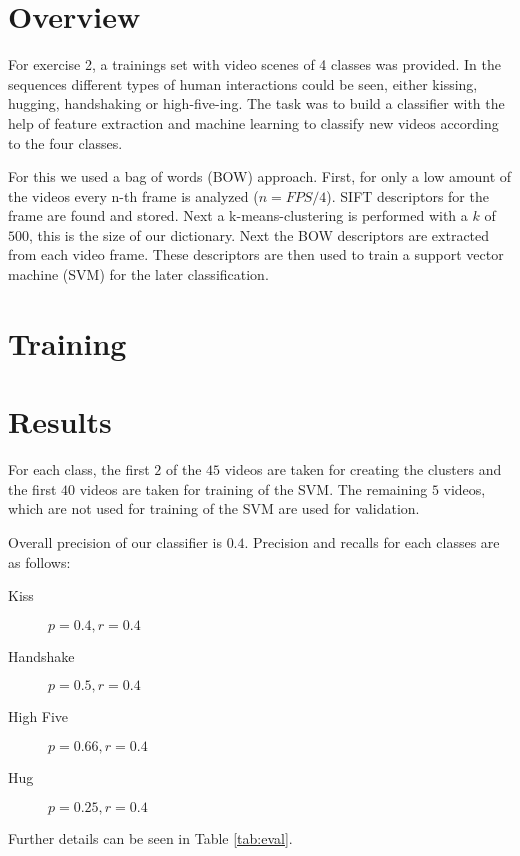 \documentclass[]{scrartcl}
\begin{document}
\maketitle

\section{Overview}
For exercise 2, a trainings set with video scenes of 4 classes was provided. 
In the sequences different types of human interactions could be seen, either kissing, hugging, handshaking or high-five-ing. 
The task was to build a classifier with the help of feature extraction and machine learning to classify new videos according to the four classes.

For this we used a bag of words (BOW) approach. 
First, for only a low amount of the videos every n-th frame is analyzed ($n = FPS/4$). 
SIFT descriptors for the frame are found and stored. 
Next a k-means-clustering is performed with a $k$ of $500$, this is the size of our dictionary. 
Next the BOW descriptors are extracted from each video frame. 
These descriptors are then used to train a support vector machine (SVM) for the later classification.

\section{Training}	


\section{Results}

For each class, the first $2$ of the $45$ videos are taken for creating the clusters and the first $40$ videos are taken for training of the SVM.
The remaining $5$ videos, which are not used for training of the SVM are used for validation.

Overall precision of our classifier is $0.4$. Precision and recalls for each classes are as follows:
\begin{description}
    \item[Kiss] $p = 0.4, r = 0.4$
    \item[Handshake] $p = 0.5, r = 0.4$
    \item[High Five] $p = 0.66, r = 0.4$
    \item[Hug] $p = 0.25, r = 0.4$
\end{description}
Further details can be seen in Table \ref{tab:eval}.
\end{document}
